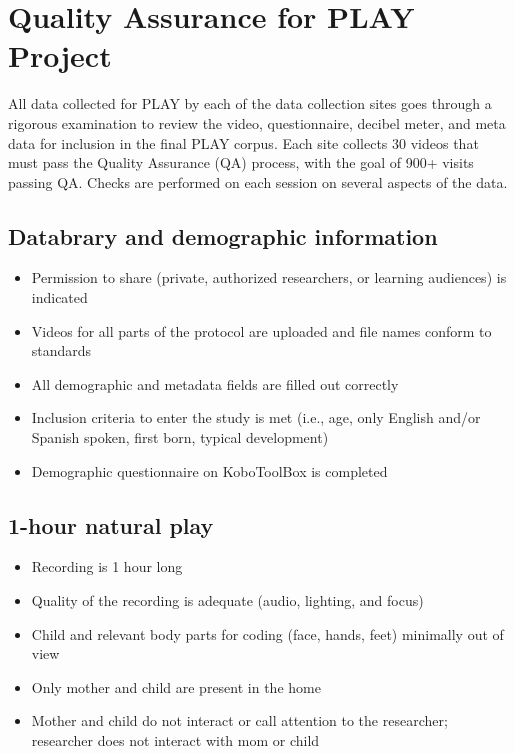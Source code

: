 \documentclass[
  12pt,
]{book}
\providecommand{\tightlist}{%
  \setlength{\itemsep}{0pt}\setlength{\parskip}{0pt}}
\begin{document}
\hypertarget{quality-assurance-for-play-project}{%
\section{Quality Assurance for PLAY Project}\label{quality-assurance-for-play-project}}

All data collected for PLAY by each of the data collection sites goes through a rigorous examination to review the video, questionnaire, decibel meter, and meta data for inclusion in the final PLAY corpus. Each site collects 30 videos that must pass the Quality Assurance (QA) process, with the goal of 900+ visits passing QA. Checks are performed on each session on several aspects of the data.

\hypertarget{databrary-and-demographic-information}{%
\subsection{Databrary and demographic information}\label{databrary-and-demographic-information}}

\begin{itemize}
\tightlist
\item
  Permission to share (private, authorized researchers, or learning audiences) is indicated
\item
  Videos for all parts of the protocol are uploaded and file names conform to standards
\item
  All demographic and metadata fields are filled out correctly
\item
  Inclusion criteria to enter the study is met (i.e., age, only English and/or Spanish spoken, first born, typical development)
\item
  Demographic questionnaire on KoboToolBox is completed
\end{itemize}

\hypertarget{hour-natural-play}{%
\subsection{1-hour natural play}\label{hour-natural-play}}

\begin{itemize}
\tightlist
\item
  Recording is 1 hour long
\item
  Quality of the recording is adequate (audio, lighting, and focus)
\item
  Child and relevant body parts for coding (face, hands, feet) minimally out of view
\item
  Only mother and child are present in the home
\item
  Mother and child do not interact or call attention to the researcher; researcher does not interact with mom or child
\end{itemize}
\end{document}
